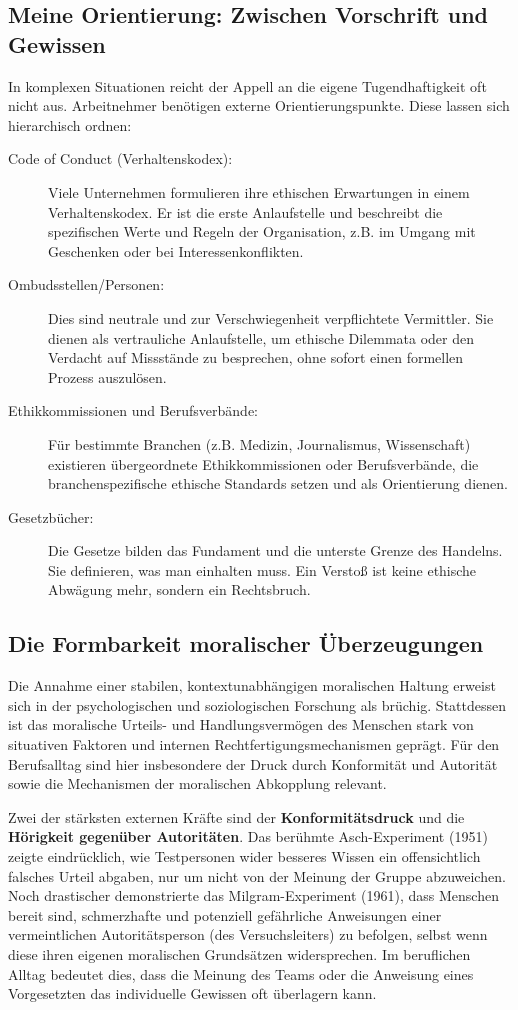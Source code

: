 \documentclass[
    12pt,               %
    a4paper,            %
    ngerman             %
]{scrartcl}
\begin{document}
\subsection{Meine Orientierung: Zwischen Vorschrift und Gewissen}
In komplexen Situationen reicht der Appell an die eigene Tugendhaftigkeit oft nicht aus. Arbeitnehmer benötigen externe Orientierungspunkte. Diese lassen sich hierarchisch ordnen:

\begin{description}
    \item[Code of Conduct (Verhaltenskodex):] Viele Unternehmen formulieren ihre ethischen Erwartungen in einem Verhaltenskodex. Er ist die erste Anlaufstelle und beschreibt die spezifischen Werte und Regeln der Organisation, z.B. im Umgang mit Geschenken oder bei Interessenkonflikten.
    \item[Ombudsstellen/Personen:] Dies sind neutrale und zur Verschwiegenheit verpflichtete Vermittler. Sie dienen als vertrauliche Anlaufstelle, um ethische Dilemmata oder den Verdacht auf Missstände zu besprechen, ohne sofort einen formellen Prozess auszulösen.
    \item[Ethikkommissionen und Berufsverbände:] Für bestimmte Branchen (z.B. Medizin, Journalismus, Wissenschaft) existieren übergeordnete Ethikkommissionen oder Berufsverbände, die branchenspezifische ethische Standards setzen und als Orientierung dienen.
    \item[Gesetzbücher:] Die Gesetze bilden das Fundament und die unterste Grenze des Handelns. Sie definieren, was man einhalten muss. Ein Verstoß ist keine ethische Abwägung mehr, sondern ein Rechtsbruch.
\end{description}

\subsection{Die Formbarkeit moralischer Überzeugungen}

Die Annahme einer stabilen, kontextunabhängigen moralischen Haltung erweist sich in der psychologischen und soziologischen Forschung als brüchig. Stattdessen ist das moralische Urteils- und Handlungsvermögen des Menschen stark von situativen Faktoren und internen Rechtfertigungsmechanismen geprägt. Für den Berufsalltag sind hier insbesondere der Druck durch Konformität und Autorität sowie die Mechanismen der moralischen Abkopplung relevant.

Zwei der stärksten externen Kräfte sind der \textbf{Konformitätsdruck} und die \textbf{Hörigkeit gegenüber Autoritäten}. Das berühmte Asch-Experiment (1951) zeigte eindrücklich, wie Testpersonen wider besseres Wissen ein offensichtlich falsches Urteil abgaben, nur um nicht von der Meinung der Gruppe abzuweichen. Noch drastischer demonstrierte das Milgram-Experiment (1961), dass Menschen bereit sind, schmerzhafte und potenziell gefährliche Anweisungen einer vermeintlichen Autoritätsperson (des Versuchsleiters) zu befolgen, selbst wenn diese ihren eigenen moralischen Grundsätzen widersprechen. Im beruflichen Alltag bedeutet dies, dass die Meinung des Teams oder die Anweisung eines Vorgesetzten das individuelle Gewissen oft überlagern kann.
\end{document}
